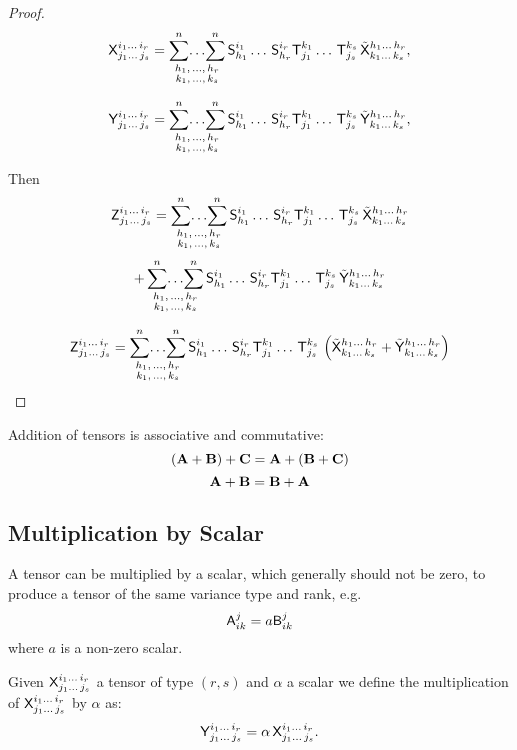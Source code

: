 \begin{proof}
\[ \mathsf{X}^{i_1\ldots\,i_r}_{j_1\ldots\,j_s}=\mathop{\displaystyle\sum^n\!{\ldots}\!\displaystyle\sum^n}_{\substack{ h_1,\,\ldots,\,h_r\\ k_1,\,\ldots,\,k_s}}  \mathsf{S}^{i_1}_{h_1}\ldots\,\mathsf{S}^{i_r}_{h_r}\mathsf{T}^{k_1}_{j_1}
\ldots\,\mathsf{T}^{k_s}_{j_s}\,\tilde{ \mathsf{X}}^{h_1\ldots\,h_r}_{k_1\ldots\,k_s},\]

\[\mathsf{Y}^{i_1\ldots\,i_r}_{j_1\ldots\,j_s}=\mathop{\displaystyle\sum^n\!{\ldots}\!\displaystyle\sum^n}_{\substack{ h_1,\,\ldots,\,h_r\\ k_1,\,\ldots,\,k_s}}  \mathsf{S}^{i_1}_{h_1}\ldots\,\mathsf{S}^{i_r}_{h_r}\mathsf{T}^{k_1}_{j_1}
\ldots\,\mathsf{T}^{k_s}_{j_s}\,\tilde{ \mathsf{Y}}^{h_1\ldots\,h_r}_{k_1\ldots\,k_s},\]

Then
\[\mathsf{Z}^{i_1\ldots\,i_r}_{j_1\ldots\,j_s}=\mathop{\displaystyle\sum^n\!{\ldots}\!\displaystyle\sum^n}_{\substack{ h_1,\,\ldots,\,h_r\\ k_1,\,\ldots,\,k_s}}  \mathsf{S}^{i_1}_{h_1}\ldots\,\mathsf{S}^{i_r}_{h_r}\mathsf{T}^{k_1}_{j_1}
\ldots\,\mathsf{T}^{k_s}_{j_s}\,\tilde{ \mathsf{X}}^{h_1\ldots\,h_r}_{k_1\ldots\,k_s}\]
\[+\mathop{\displaystyle\sum^n\!{\ldots}\!\displaystyle\sum^n}_{\substack{ h_1,\,\ldots,\,h_r\\ k_1,\,\ldots,\,k_s}}  \mathsf{S}^{i_1}_{h_1}\ldots\,\mathsf{S}^{i_r}_{h_r}\mathsf{T}^{k_1}_{j_1}
\ldots\,\mathsf{T}^{k_s}_{j_s}\,\tilde{ \mathsf{Y}}^{h_1\ldots\,h_r}_{k_1\ldots\,k_s}\]

\[\mathsf{Z}^{i_1\ldots\,i_r}_{j_1\ldots\,j_s}=\mathop{\displaystyle\sum^n\!{\ldots}\!\displaystyle\sum^n}_{\substack{ h_1,\,\ldots,\,h_r\\ k_1,\,\ldots,\,k_s}}  \mathsf{S}^{i_1}_{h_1}\ldots\,\mathsf{S}^{i_r}_{h_r}\mathsf{T}^{k_1}_{j_1}
\ldots\,\mathsf{T}^{k_s}_{j_s}\,\left( \tilde{ \mathsf{X}}^{h_1\ldots\,h_r}_{k_1\ldots\,k_s} +\tilde{ \mathsf{Y}}^{h_1\ldots\,h_r}_{k_1\ldots\,k_s}\right)
\]

\end{proof}




 Addition of tensors is associative and commutative:
\begin{equation}
\left(\mathbf{ A}+\mathbf{ B}\right)+\mathbf{ C}=\mathbf{ A}+\left(\mathbf{ B}+\mathbf{ C}\right)
\end{equation}
\begin{equation}
\mathbf{ A}+\mathbf{ B}=\mathbf{ B}+\mathbf{ A}
\end{equation}



\subsection{Multiplication by Scalar\label{subMultiplicationbyScalar}}

 A tensor can be multiplied by a scalar, which generally
should not be zero, to produce a tensor of the same variance type
and rank, e.g.
\begin{equation}
\mathsf{A}_{ik}^{j}=a\mathsf{B}_{ik}^{j}
\end{equation}
where $a$ is a non-zero scalar.

\begin{df} Given $\mathsf{X}^{i_1\ldots\,i_r}_{j_1\ldots\,j_s}$ a tensor of type $(r,s)$  and $\alpha$ a scalar we define the  multiplication of $\mathsf{X}^{i_1\ldots\,i_r}_{j_1\ldots\,j_s}$ by $\alpha$ as:
$$
\mathsf{Y}^{i_1\ldots\,i_r}_{j_1\ldots\,j_s}=\alpha\,
\mathsf{X}^{i_1\ldots\,i_r}_{j_1\ldots\,j_s}.
$$
\end{df}

